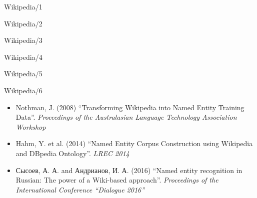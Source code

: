 \documentclass[10pt, compress]{beamer}
\begin{document}
\begin{frame}{Wikipedia/1}


\end{frame}

\begin{frame}{Wikipedia/2}


\end{frame}

\begin{frame}{Wikipedia/3}


\end{frame}

\begin{frame}{Wikipedia/4}


\end{frame}

\begin{frame}{Wikipedia/5}


\end{frame}

\begin{frame}{Wikipedia/6}

\begin{itemize}
  \item Nothman, J. (2008) ``Transforming Wikipedia into Named Entity Training Data''. \emph{Proceedings of the Australasian Language Technology Association Workshop}
  \item Hahm, Y. et al. (2014) ``Named Entity Corpus Construction using Wikipedia and DBpedia Ontology''. \emph{LREC 2014}
  \item Сысоев, А. А. and Андрианов, И. А. (2016) ``Named entity recognition in Russian: The power of a Wiki-based approach''. \emph{Proceedings of the International Conference “Dialogue 2016”}
\end{itemize}

\end{frame}
\end{document}
